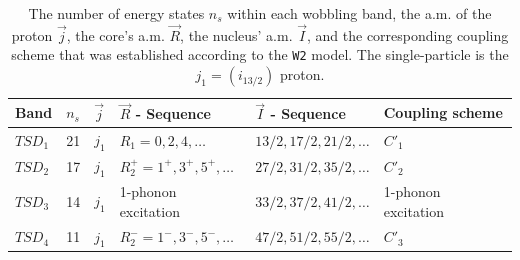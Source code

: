 \documentclass[myclassdoc,debug]{rjparticle}
\begin{document}
\begin{table}
    \centering
  \begin{tabular}{llllll}
  \hline
  Band & $n_s$ & $\vec{j}$ & $\vec{R}$ - Sequence & $\vec{I}$ - Sequence & Coupling scheme \\
  \hline
  \hline
     $TSD_1$ &       21      &   $j_1$  &        $R_1=0,2,4,\dots$         &   $13/2,17/2,21/2,\dots$    & $C'_1$     \\
     $TSD_2$ &        17     &   $j_1$   &       $R_2^+=1^+,3^+,5^+,\dots$             &      $27/2,31/2,35/2,\dots$                &      $C'_2$           \\
     $TSD_3$ &      14       &    $j_1$  &           1-phonon excitation         & $33/2,37/2,41/2,\dots$                &       1-phonon excitation           \\
     $TSD_4$ &       11      &   $j_1$   &    $R_2^-=1^-,3^-,5^-,\dots$                &               $47/2,51/2,55/2,\dots$         &      $C'_3$          \\
     \hline
\end{tabular}
    \caption{The number of energy states $n_s$ within each wobbling band, the a.m. of the proton $\vec{j}$, the core's a.m. $\vec{R}$, the nucleus' a.m. $\vec{I}$, and the corresponding coupling scheme that was established according to the \texttt{W2} model. The single-particle is the $j_1=(i_{13/2})$ proton.}
    \label{4-band-information}
\end{table}
\end{document}
